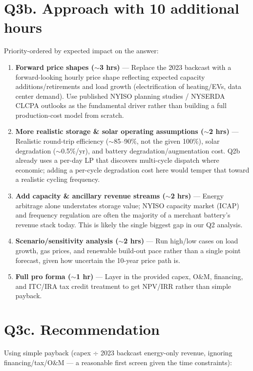 \documentclass[11pt]{article}
\begin{document}
\section*{Q3b. Approach with 10 additional hours}

Priority-ordered by expected impact on the answer:

\begin{enumerate}[leftmargin=1.4em]
  \item \textbf{Forward price shapes ($\sim$3 hrs)} --- Replace the 2023 backcast with a
  forward-looking hourly price shape reflecting expected capacity additions/retirements and load
  growth (electrification of heating/EVs, data center demand). Use published NYISO planning
  studies / NYSERDA CLCPA outlooks as the fundamental driver rather than building a full
  production-cost model from scratch.
  \item \textbf{More realistic storage \& solar operating assumptions ($\sim$2 hrs)} --- Realistic
  round-trip efficiency ($\sim$85--90\%, not the given 100\%), solar degradation ($\sim$0.5\%/yr),
  and battery degradation/augmentation cost. Q2b already uses a per-day LP that discovers
  multi-cycle dispatch where economic; adding a per-cycle degradation cost here would temper
  that toward a realistic cycling frequency.
  \item \textbf{Add capacity \& ancillary revenue streams ($\sim$2 hrs)} --- Energy arbitrage alone
  understates storage value; NYISO capacity market (ICAP) and frequency regulation are often the
  majority of a merchant battery's revenue stack today. This is likely the single biggest gap in
  our Q2 analysis.
  \item \textbf{Scenario/sensitivity analysis ($\sim$2 hrs)} --- Run high/low cases on load growth,
  gas prices, and renewable build-out pace rather than a single point forecast, given how uncertain
  the 10-year price path is.
  \item \textbf{Full pro forma ($\sim$1 hr)} --- Layer in the provided capex, O\&M, financing, and
  ITC/IRA tax credit treatment to get NPV/IRR rather than simple payback.
\end{enumerate}

\section*{Q3c. Recommendation}

Using simple payback (capex $\div$ 2023 backcast energy-only revenue, ignoring
financing/tax/O\&M --- a reasonable first screen given the time constraints):
\end{document}

